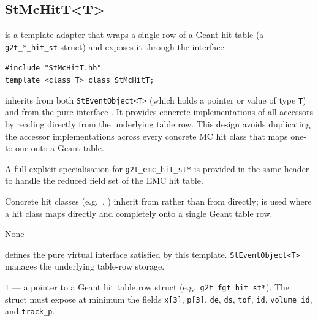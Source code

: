 \subsection{StMcHitT\textless{}T\textgreater{}}
\label{sec:StMcHitT}
\begin{Entry}
\item[Summary]
     is a template adapter that wraps a
    single row of a Geant hit table (a \verb+g2t_*_hit_st+ struct) and
    exposes it through the  interface.

\item[Synopsis]
    \verb+#include "StMcHitT.hh"+\\
    \verb+template <class T> class StMcHitT;+\\

\item[Description]
     inherits from both
    \verb+StEventObject<T>+ (which holds a pointer or value of type
    \verb+T+) and from the pure interface .
    It provides concrete implementations of all  accessors
    by reading directly from the underlying table row.
    This design avoids duplicating the accessor implementations across every
    concrete MC hit class that maps one-to-one onto a Geant table.

    A full explicit specialisation for \verb+g2t_emc_hit_st*+ is provided
    in the same header to handle the reduced field set of the EMC hit table.

    Concrete hit classes (e.g.\ , )
    inherit from  rather than from  directly;
     is used where a hit class maps directly and completely
    onto a single Geant table row.

\item[Persistence]
    None

\item[Related Classes]
     defines the pure virtual interface satisfied by this
    template.
    \verb+StEventObject<T>+ manages the underlying table-row storage.

\item[Template\\ Parameter]
    \verb+T+ --- a pointer to a Geant hit table row struct
    (e.g.\ \verb+g2t_fgt_hit_st*+).  The struct must expose at minimum
    the fields \verb+x[3]+, \verb+p[3]+, \verb+de+, \verb+ds+,
    \verb+tof+, \verb+id+, \verb+volume_id+, and \verb+track_p+.


\end{Entry}
